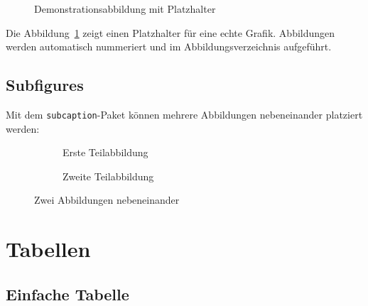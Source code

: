 \begin{figure}[h]
	\centering
	\caption{Demonstrationsabbildung mit Platzhalter}
	\label{fig:demo_abbildung}
\end{figure}

Die Abbildung~\ref{fig:demo_abbildung} zeigt einen Platzhalter für eine echte Grafik. Abbildungen werden automatisch nummeriert und im Abbildungsverzeichnis aufgeführt.

\subsection*{Subfigures}
\label{subsec:subfigures}

Mit dem \texttt{subcaption}-Paket können mehrere Abbildungen nebeneinander platziert werden:

\begin{figure}[h]
	\centering
	\begin{subfigure}[b]{0.45\textwidth}
		\centering
		\caption{Erste Teilabbildung}
		\label{fig:sub1}
	\end{subfigure}
	\hfill
	\begin{subfigure}[b]{0.45\textwidth}
		\centering
		\caption{Zweite Teilabbildung}
		\label{fig:sub2}
	\end{subfigure}
	\caption{Zwei Abbildungen nebeneinander}
	\label{fig:subfigures_demo}
\end{figure}

\section{Tabellen}
\label{sec:tabellen_demo}

\subsection*{Einfache Tabelle}
\label{subsec:einfache_tabelle}

